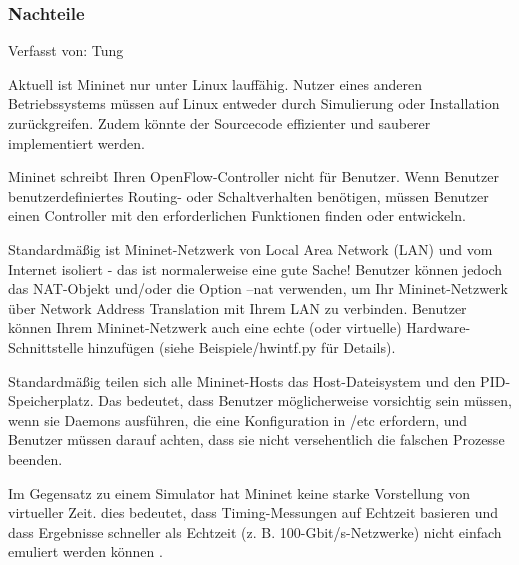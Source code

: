 \documentclass[fontsize=12pt,paper=a4,open=any,parskip=half,
  twoside=false,toc=listof,toc=bibliography,fleqn,leqno,
  captions=nooneline,captions=tableabove,british]{scrbook}
\begin{document}
\subsubsection{Nachteile}
{\tiny Verfasst von: Tung\par}
Aktuell ist Mininet nur unter Linux lauffähig. Nutzer eines anderen Betriebssystems müssen auf Linux entweder durch Simulierung oder Installation zurückgreifen. Zudem könnte der Sourcecode effizienter und sauberer implementiert werden.\par
Mininet schreibt Ihren OpenFlow-Controller nicht für Benutzer. Wenn Benutzer benutzerdefiniertes Routing- oder Schaltverhalten benötigen, müssen Benutzer einen Controller mit den erforderlichen Funktionen finden oder entwickeln.\par
Standardmäßig ist Mininet-Netzwerk von Local Area Network (LAN) und vom Internet isoliert - das ist normalerweise eine gute Sache! Benutzer können jedoch das NAT-Objekt und/oder die Option --nat verwenden, um Ihr Mininet-Netzwerk über Network Address Translation mit Ihrem LAN zu verbinden. Benutzer können Ihrem Mininet-Netzwerk auch eine echte (oder virtuelle) Hardware-Schnittstelle hinzufügen (siehe Beispiele/hwintf.py für Details).\par
Standardmäßig teilen sich alle Mininet-Hosts das Host-Dateisystem und den PID\hyp{}Speicherplatz. Das bedeutet, dass Benutzer möglicherweise vorsichtig sein müssen, wenn sie Daemons ausführen, die eine Konfiguration in /etc erfordern, und Benutzer müssen darauf achten, dass sie nicht versehentlich die falschen Prozesse beenden. \par
Im Gegensatz zu einem Simulator hat Mininet keine starke Vorstellung von virtueller Zeit. dies bedeutet, dass Timing-Messungen auf Echtzeit basieren und dass Ergebnisse schneller als Echtzeit (z. B. 100-Gbit/s-Netzwerke) nicht einfach emuliert werden können \cite{mnnachteile}.
\end{document}
